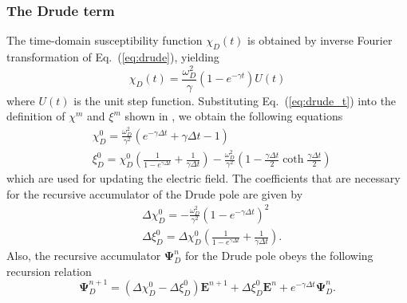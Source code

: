 \subsubsection{The Drude term}
\label{sec:plrc_dp}
The time-domain susceptibility function $\chi_D(t)$ is obtained by inverse Fourier transformation of Eq.~(\ref{eq:drude}), yielding
\begin{equation}
\chi_D(t) = \frac{\omega_D^2}{\gamma} (1 - e^{-\gamma t}) U(t)
\label{eq:drude_t}
\end{equation}
where $U(t)$ is the unit step function. Substituting Eq.~(\ref{eq:drude_t}) into the definition of $\chi^m$ and $\xi^m$ shown in \citet{kelley_piecewise_1996}, we obtain the following equations
\begin{equation}
\begin{split}
&\chi_D^0 = \frac{\omega_D^2}{\gamma^2} (e^{-\gamma \Delta t} + \gamma \Delta t - 1)\\
&\xi_D^0 = \chi_D^0 \left ( \frac{1}{1 - e^{\gamma \Delta t}} + \frac{1}{\gamma \Delta t} \right ) - \frac{\omega_D^2}{\gamma^2} \left ( 1 - \frac{\gamma \Delta t}{2} \coth \frac{\gamma \Delta t}{2} \right )
\end{split}
\end{equation}
which are used for updating the electric field. The coefficients that are necessary for the recursive accumulator of the Drude pole are given by
\begin{equation}
\begin{split}
& \Delta \chi_D^0 = - \frac{\omega_D^2}{\gamma^2} (1 - e^{-\gamma \Delta t})^2\\
& \Delta \xi_D^0 = \Delta \chi_D^0 \left ( \frac{1}{1 - e^{\gamma \Delta t}}  + \frac{1}{\gamma \Delta t} \right ).
\end{split}
\end{equation}
Also, the recursive accumulator $\mathbf{\Psi}_D^n$ for the Drude pole obeys the following recursion relation
\begin{equation}
\mathbf{\Psi}_D^{n+1} = (\Delta\chi_D^0 - \Delta\xi_D^0) \mathbf{E}^{n+1} + \Delta \xi_D^0 \mathbf{E}^n + e^{-\gamma \Delta t} \mathbf{\Psi}_D^n.
\label{eq:rec_accu_dp}
\end{equation}

